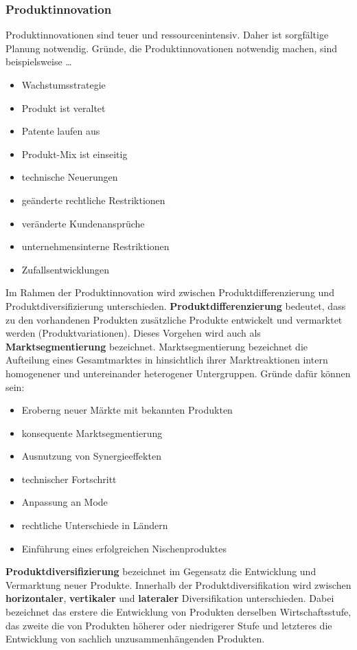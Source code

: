 {\subsubsection{Produktinnovation}

Produktinnovationen sind teuer und ressourcenintensiv. Daher ist sorgfältige Planung notwendig. Gründe, die Produktinnovationen notwendig machen, sind beispielsweise \dots

\begin{itemize}
	\item Wachstumsstrategie
	\item Produkt ist veraltet
	\item Patente laufen aus
	\item Produkt-Mix ist einseitig
	\item technische Neuerungen
	\item geänderte rechtliche Restriktionen
	\item veränderte Kundenansprüche
	\item unternehmensinterne Restriktionen
	\item Zufallsentwicklungen
\end{itemize}

Im Rahmen der Produktinnovation wird zwischen Produktdifferenzierung und Produktdiversifizierung unterschieden. {\bf Produktdifferenzierung} bedeutet, dass zu den vorhandenen Produkten zusätzliche Produkte entwickelt und vermarktet werden (Produktvariationen). Dieses Vorgehen wird auch als {\bf Marktsegmentierung} bezeichnet. Marktsegmentierung bezeichnet die Aufteilung eines Gesamtmarktes in hinsichtlich ihrer Marktreaktionen intern homogenener und untereinander heterogener Untergruppen. Gründe dafür können sein:

\begin{itemize}
	\item Eroberng neuer Märkte mit bekannten Produkten
	\item konsequente Marktsegmentierung
	\item Ausnutzung von Synergieeffekten
	\item technischer Fortschritt
	\item Anpassung an Mode
	\item {rechtliche Unterschiede in Ländern}
	\item Einführung eines erfolgreichen Nischenproduktes
\end{itemize}

{\bf Produktdiversifizierung} bezeichnet im Gegensatz die Entwicklung und Vermarktung neuer Produkte. Innerhalb der Produktdiversifikation wird zwischen {\bf horizontaler}, {\bf vertikaler} und {\bf lateraler} Diversifikation unterschieden. Dabei bezeichnet das erstere die Entwicklung von Produkten derselben Wirtschaftsstufe, das zweite die von Produkten höherer oder niedrigerer Stufe und letzteres die Entwicklung von sachlich unzusammenhängenden Produkten.
			 
}
